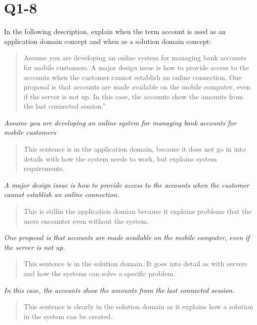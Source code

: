 \section{Q1-8}
In the following description, explain when the term account is used as an application domain concept and when as a solution domain concept:\\
\begin{quote}
Assume you are developing an online system for managing bank accounts for mobile customers. A major design issue is how to provide access to the accounts when the customer cannot establish an online connection. One proposal is that accounts are made available on the mobile computer, even if the server is not up. In this case, the accounts show the amounts from the last connected session.”\\
\end{quote}
\emph{Assume you are developing an online system for managing bank accounts for mobile customers}
\begin{quote}
This sentence is in the application domain, because it does not go in into details with how the system needs to work, but explains system requirements.\\
\end{quote}

\emph{A major design issue is how to provide access to the accounts when the customer cannot establish an online connection.}
\begin{quote}
This is stillin the application domian because it explains problems that the users encounter even without the system.\\
\end{quote}

\emph{One proposal is that accounts are made available on the mobile computer, even if the server is not up.} 
\begin{quote}
This sentence is in the solution domain. It goes into detail as with servers and how the systems can solve a specific problem.\\
\end{quote}

\emph{In this case, the accounts show the amounts from the last connected session.}
\begin{quote}
This sentence is clearly in the solution domain as it explains how a solution in the system can be created.
\end{quote}
